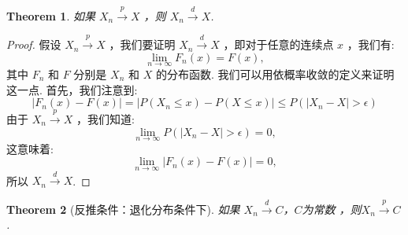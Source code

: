 \documentclass[UTF8,12pt]{ctexart}
\numberwithin{equation}{section}%
\newtheorem{thm}{Theorem}[section]
\begin{document}
	\begin{thm}
		如果 $X_n \stackrel{p}{\longrightarrow} X$ ，则 $X_n \stackrel{d}{\longrightarrow} X$.
	\end{thm}
	
	\begin{proof}
		假设 $X_n \stackrel{p}{\longrightarrow} X$ ，我们要证明 $X_n \stackrel{d}{\longrightarrow} X$ ，即对于任意的连续点 $x$ ，我们有:
		$$
		\lim _{n \rightarrow \infty} F_n(x)=F(x),
		$$
		其中 $F_n$ 和 $F$ 分别是 $X_n$ 和 $X$ 的分布函数. 我们可以用依概率收敛的定义来证明这一点. 首先，我们注意到:
		$$
		\left|F_n(x)-F(x)\right|=\left|P\left(X_n \leq x\right)-P(X \leq x)\right| \leq P\left(\left|X_n-X\right|>\epsilon\right)
		$$
		由于 $X_n \stackrel{p}{\longrightarrow} X$ ，我们知道:
		$$
		\lim _{n \rightarrow \infty} P\left(\left|X_n-X\right|>\epsilon\right)=0,
		$$
		这意味着:
		$$
		\lim _{n \rightarrow \infty}\left|F_n(x)-F(x)\right|=0,
		$$
		所以 $X_n \stackrel{d}{\longrightarrow} X$.
	\end{proof}

	\begin{thm}[反推条件：退化分布条件下]
		如果 $X_n \stackrel{d}{\longrightarrow} C$，$C$为常数 ，则$X_n \stackrel{p}{\longrightarrow} C$ .
	\end{thm}

	
\end{document}

